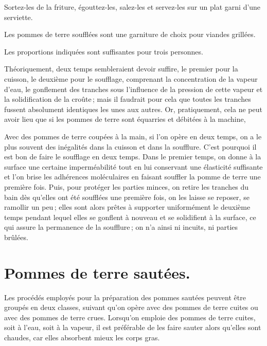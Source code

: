 Sortez-les de la friture, égouttez-les, salez-les et servez-les sur un plat
garni d'une serviette.

\medskip

Les pommes de terre soufflées sont une garniture de choix pour viandes grillées.

Les proportions indiquées sont suffisantes pour trois personnes.

\medskip

Théoriquement, deux temps sembleraient devoir suffire, le premier pour la
cuisson, le deuxième pour le soufflage, comprenant la concentration de la
vapeur d'eau, le gonflement des tranches sous l'influence de la pression de
cette vapeur et la solidification de la croûte ; mais il faudrait pour cela que
toutes les tranches fussent absolument identiques les unes aux autres. Or,
pratiquement, cela ne peut avoir lieu que si les pommes de terre sont équarries
et débitées à la machine,

Avec des pommes de terre coupées à la main, si l'on opère en deux temps, on
a le plus souvent des inégalités dans la cuisson et dans la soufflure. C'est
pourquoi il est bon de faire le soufflage en deux temps. Dans le premier temps,
on donne à la surface une certaine imperméabilité tout en lui conservant une
élasticité suffisante et l'on brise les adhérences moléculaires en faisant
souffler la pomme de terre une première fois. Puis, pour protéger les parties
minces, on retire les tranches du bain dès qu'elles ont été soufflées une
première fois, on les laisse se reposer, se ramollir un peu ; elles sont alors
prêtes à supporter uniformément le deuxième temps pendant lequel elles se
gonflent à nouveau et se solidifient à la surface, ce qui assure la permanence
de la soufflure ; on n'a ainsi ni incuits, ni parties brûlées.

\section*{\centering Pommes de terre sautées.}
{}
\label{pg0717} \hypertarget{p0717}{}

Les procédés employés pour la préparation des pommes sautées peuvent être
groupés en deux classes, suivant qu'on opère avec des pommes de terre cuites ou
avec des pommes de terre crues. Lorsqu'on emploie des pommes de terre cuites,
soit à l'eau, soit à la vapeur, il est préférable de les faire sauter alors qu'elles sont
chaudes, car elles absorbent mieux les corps gras.

